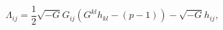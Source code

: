 \begin{equation}
{\Lambda}_{ij}=\frac{1}{2}\sqrt{-G}G_{ij}\left(G^{kl}h_{kl}-(p-1)\right)
-\sqrt{-G}h_{ij},
\end{equation}

